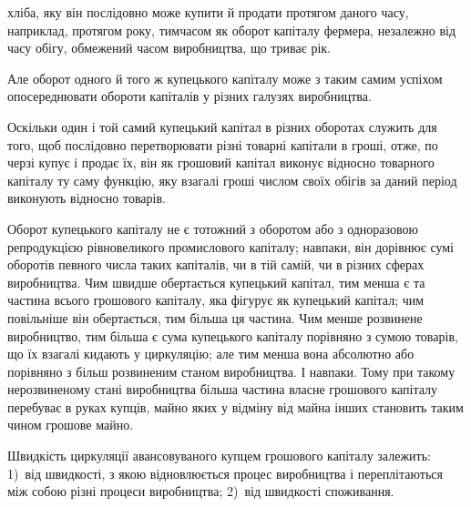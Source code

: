 \parcont{}  %
хліба, яку він послідовно може купити й продати протягом даного
часу, наприклад, протягом року, тимчасом як оборот капіталу
фермера, незалежно від часу обігу, обмежений часом
виробництва, що триває рік.

Але оборот одного й того ж купецького капіталу може з таким
самим успіхом опосереднювати обороти капіталів у різних
галузях виробництва.

Оскільки один і той самий купецький капітал в різних оборотах
служить для того, щоб послідовно перетворювати різні
товарні капітали в гроші, отже, по черзі купує і продає їх, він
як грошовий капітал виконує відносно товарного капіталу ту
саму функцію, яку взагалі гроші числом своїх обігів за даний
період виконують відносно товарів.

Оборот купецького капіталу не є тотожний з оборотом або
з одноразовою репродукцією рівновеликого промислового капіталу;
навпаки, він дорівнює сумі оборотів певного числа таких
капіталів, чи в тій самій, чи в різних сферах виробництва. Чим
швидше обертається купецький капітал, тим менша є та частина
всього грошового капіталу, яка фігурує як купецький капітал;
чим повільніше він обертається, тим більша ця частина. Чим
менше розвинене виробництво, тим більша є сума купецького
капіталу порівняно з сумою товарів, що їх взагалі кидають у циркуляцію;
але тим менша вона абсолютно або порівняно з більш
розвиненим станом виробництва. І навпаки. Тому при такому
нерозвиненому стані виробництва більша частина власне грошового
капіталу перебуває в руках купців, майно яких у відміну
від майна інших становить таким чином грошове майно.

Швидкість циркуляції авансовуваного купцем грошового
капіталу залежить: 1)~від швидкості, з якою відновлюється
процес виробництва і переплітаються між собою різні процеси
виробництва; 2)~від швидкості споживання.

